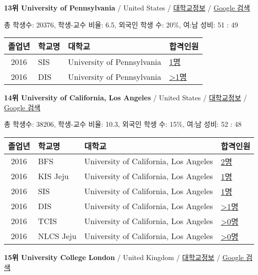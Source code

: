 \documentclass[13pt,]{article}
\begin{document}
\textbf{13위 University of Pennsylvania} / United States /
\href{https://www.timeshighereducation.com/world-university-rankings/university-of-pennsylvania?ranking-dataset=589595}{대학교정보}
/
\href{http://www.google.com/search?q=University+of+Pennsylvania}{Google
검색}

총 학생수: 20376, 학생-교수 비율: 6.5, 외국인 학생 수: 20\%, 여:남 성비:
51 : 49

\begin{longtable}[]{@{}clll@{}}
\toprule
졸업년 & 학교명 & 대학교 & 합격인원\tabularnewline
\midrule
\endhead
2016 & SIS & University of Pennsylvania &
\href{http://cafe.naver.com/assarabia/11589}{1명}\tabularnewline
2016 & DIS & University of Pennsylvania &
\href{http://cafe.naver.com/assarabia/11591}{\textgreater{}1명}\tabularnewline
\bottomrule
\end{longtable}

\textbf{14위 University of California, Los Angeles} / United States /
\href{https://www.timeshighereducation.com/world-university-rankings/university-of-california-los-angeles?ranking-dataset=589595}{대학교정보}
/
\href{http://www.google.com/search?q=University+of+California,+Los+Angeles}{Google
검색}

총 학생수: 38206, 학생-교수 비율: 10.3, 외국인 학생 수: 15\%, 여:남
성비: 52 : 48

\begin{longtable}[]{@{}clll@{}}
\toprule
졸업년 & 학교명 & 대학교 & 합격인원\tabularnewline
\midrule
\endhead
2016 & BFS & University of California, Los Angeles &
\href{http://cafe.naver.com/assarabia/11597}{2명}\tabularnewline
2016 & KIS Jeju & University of California, Los Angeles &
\href{http://cafe.naver.com/assarabia/11596}{1명}\tabularnewline
2016 & SIS & University of California, Los Angeles &
\href{http://cafe.naver.com/assarabia/11589}{1명}\tabularnewline
2016 & DIS & University of California, Los Angeles &
\href{http://cafe.naver.com/assarabia/11591}{\textgreater{}1명}\tabularnewline
2016 & TCIS & University of California, Los Angeles &
\href{http://cafe.naver.com/assarabia/11598}{\textgreater{}0명}\tabularnewline
2016 & NLCS Jeju & University of California, Los Angeles &
\href{http://cafe.naver.com/assarabia/11592}{\textgreater{}0명}\tabularnewline
\bottomrule
\end{longtable}

\textbf{15위 University College London} / United Kingdom /
\href{https://www.timeshighereducation.com/world-university-rankings/university-college-london?ranking-dataset=589595}{대학교정보}
/ \href{http://www.google.com/search?q=University+College+London}{Google
검색}
\end{document}
